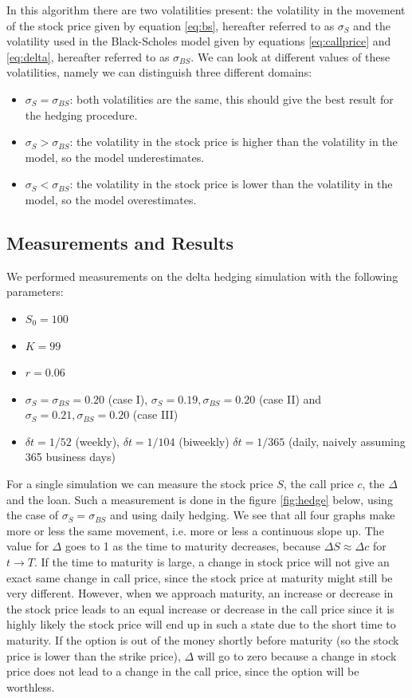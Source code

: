 \documentclass[11pt,a4paper]{article}
\begin{document}
In this algorithm there are two volatilities present: the volatility in the movement of the stock price given by equation \ref{eq:bs}, hereafter referred to as $\sigma_S$ and the volatility used in the Black-Scholes model given by equations \ref{eq:callprice} and \ref{eq:delta}, hereafter referred to as $\sigma_{BS}$. We can look at different values of these volatilities, namely we can distinguish three different domains:

\begin{itemize}
\item 
  $\sigma_S = \sigma_{BS}$: both volatilities are the same, this should give the best result for the hedging procedure.
\item
  $\sigma_S > \sigma_{BS}$: the volatility in the stock price is higher than the volatility in the model, so the model underestimates.
\item
  $\sigma_S < \sigma_{BS}$: the volatility in the stock price is lower than the volatility in the model, so the model overestimates.
\end{itemize}

\subsection{Measurements and Results}

We performed measurements on the delta hedging simulation with the following parameters:

\begin{itemize}
\item 
  $S_0 = 100$
\item
  $K = 99$
\item
  $r = 0.06$
\item
  $\sigma_S = \sigma_{BS} = 0.20$ (case I), $\sigma_S = 0.19, \sigma_{BS} = 0.20$ (case II) and $\sigma_S = 0.21, \sigma_{BS} = 0.20$ (case III)
\item
  $\delta t = 1/52$ (weekly), $\delta t = 1/104$ (biweekly) $\delta t = 1/365$ (daily, naively assuming 365 business days)
\end{itemize}

For a single simulation we can measure the stock price $S$, the call price $c$, the $\Delta$ and the loan. Such a measurement is done in the figure \ref{fig:hedge} below, using the case of $\sigma_S = \sigma_{BS}$ and using daily hedging. We see that all four graphs make more or less the same movement, i.e. more or less a continuous slope up. The value for $\Delta$ goes to 1 as the time to maturity decreases, because $\Delta S \approx \Delta c$ for $t \rightarrow T$. If the time to maturity is large, a change in stock price will not give an exact same change in call price, since the stock price at maturity might still be very different. However, when we approach maturity, an increase or decrease in the stock price leads to an equal increase or decrease in the call price since it is highly likely the stock price will end up in such a state due to the short time to maturity. If the option is out of the money shortly before maturity (so the stock price is lower than the strike price), $\Delta$ will go to zero because a change in stock price does not lead to a change in the call price, since the option will be worthless.
\end{document}
